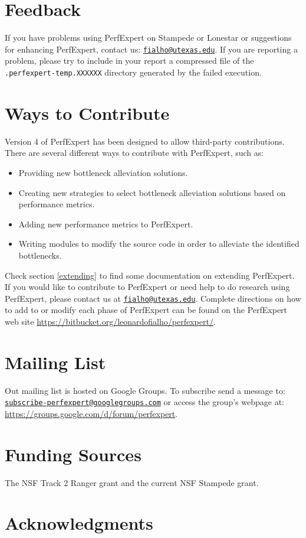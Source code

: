 \section{Feedback}

If you have problems using PerfExpert on Stampede or Lonestar or suggestions for enhancing PerfExpert, contact us: \href{mailto:fialho@utexas.edu}{\texttt{fialho@utexas.edu}}. If you are reporting a problem, please try to include in your report a compressed file of the \texttt{.perfexpert-temp.XXXXXX} directory generated by the failed execution.

\section{Ways to Contribute}

Version 4 of PerfExpert has been designed to allow third-party contributions. There are several different ways to contribute with PerfExpert, such as:

\begin{itemize}
	\item Providing new bottleneck alleviation solutions.
	\item Creating new strategies to select bottleneck alleviation solutions based on performance metrics.
	\item Adding new performance metrics to PerfExpert.
	\item Writing modules to modify the source code in order to alleviate the identified bottlenecks.
\end{itemize}

Check section \ref{extending} to find some documentation on extending PerfExpert. If you would like to contribute to PerfExpert or need help to do research using PerfExpert, please contact us at \href{mailto:fialho@utexas.edu}{\texttt{fialho@utexas.edu}}. Complete directions on how to add to or modify each phase of PerfExpert can be found on the PerfExpert web site \url{https://bitbucket.org/leonardofialho/perfexpert/}.

\section{Mailing List}

Out mailing list is hosted on Google Groups. To subscribe send a message to:\\
\href{subscribe-perfexpert@googlegroups.com}{\texttt{subscribe-perfexpert@googlegroups.com}} or access the group's webpage at:\\\url{https://groups.google.com/d/forum/perfexpert}.

\section{Funding Sources}

The NSF Track 2 Ranger grant and the current NSF Stampede grant.

\section{Acknowledgments}
